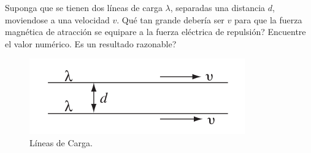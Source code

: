 \begin{mdframed}[style=warning]
	\begin{ejercicio}
		Suponga que se tienen dos líneas de carga $\lambda$, separadas una distancia $d$, moviendose a una velocidad $v$. Qué tan grande debería ser $v$ para que la fuerza magnética de atracción se equipare a la fuerza eléctrica de repulsión? Encuentre el valor numérico. Es un resultado razonable?
		\begin{figure}[H]
			\centering
			\includegraphics[scale=0.5]{./img/p2.png}
			\caption{Líneas de Carga.}
			\label{DF}	
		\end{figure}
	\end{ejercicio}
\end{mdframed}
























